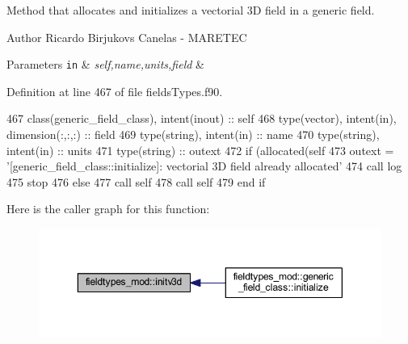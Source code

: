 Method that allocates and initializes a vectorial 3D field in a generic field. 

\begin{DoxyAuthor}{Author}
Ricardo Birjukovs Canelas -\/ M\+A\+R\+E\+T\+EC 
\end{DoxyAuthor}

\begin{DoxyParams}[1]{Parameters}
\mbox{\tt in}  & {\em self,name,units,field} & \\
\hline
\end{DoxyParams}


Definition at line 467 of file fields\+Types.\+f90.


\begin{DoxyCode}
467     \textcolor{keywordtype}{class}(generic\_field\_class), \textcolor{keywordtype}{intent(inout)} :: self
468     \textcolor{keywordtype}{type}(vector), \textcolor{keywordtype}{intent(in)}, \textcolor{keywordtype}{dimension(:,:,:)} :: field
469     \textcolor{keywordtype}{type}(string), \textcolor{keywordtype}{intent(in)} :: name
470     \textcolor{keywordtype}{type}(string), \textcolor{keywordtype}{intent(in)} :: units
471     \textcolor{keywordtype}{type}(string) :: outext
472     \textcolor{keywordflow}{if} (\textcolor{keyword}{allocated}(self%
473         outext = \textcolor{stringliteral}{'[generic\_field\_class::initialize]: vectorial 3D field already allocated'}
474         \textcolor{keyword}{call }log%
475         stop
476     \textcolor{keywordflow}{else}
477         \textcolor{keyword}{call }self%
478         \textcolor{keyword}{call }self%
479 \textcolor{keywordflow}{    end if}
\end{DoxyCode}
Here is the caller graph for this function\+:\nopagebreak
\begin{figure}[H]
\begin{center}
\leavevmode
\includegraphics[width=350pt]{namespacefieldtypes__mod_aa0a152c9e5131d3003cc34e4f3b2974d_icgraph}
\end{center}
\end{figure}
\mbox{\label{namespacefieldtypes__mod_a08d665678bea0956a323d08863e164e5}} 
